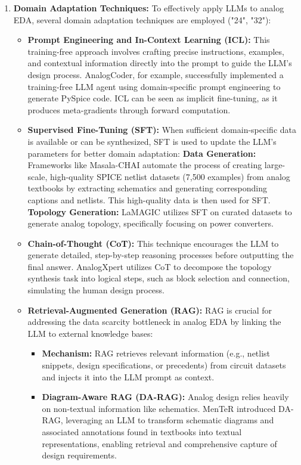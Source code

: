 \documentclass{ieeeaccess}
\begin{document}
\begin{enumerate}
	\item \textbf{Domain Adaptation Techniques:} To effectively apply LLMs to analog EDA, several domain adaptation techniques are employed ("24", "32"):
	    \begin{itemize} %
		    \item \textbf{Prompt Engineering and In-Context Learning (ICL):} This training-free approach involves crafting precise instructions, examples, and contextual information directly into the prompt to guide the LLM's design process. AnalogCoder, for example, successfully implemented a training-free LLM agent using domain-specific prompt engineering to generate PySpice code. ICL can be seen as implicit fine-tuning, as it produces meta-gradients through forward computation.
		    \item \textbf{Supervised Fine-Tuning (SFT):} When sufficient domain-specific data is available or can be synthesized, SFT is used to update the LLM's parameters for better domain adaptation:
		            \textbf{Data Generation:} Frameworks like Masala-CHAI automate the process of creating large-scale, high-quality SPICE netlist datasets (7,500 examples) from analog textbooks by extracting schematics and generating corresponding captions and netlists. This high-quality data is then used for SFT.
		            \textbf{Topology Generation:} LaMAGIC utilizes SFT on curated datasets to generate analog topology, specifically focusing on power converters.
		    \item \textbf{Chain-of-Thought (CoT):} This technique encourages the LLM to generate detailed, step-by-step reasoning processes before outputting the final answer. AnalogXpert utilizes CoT to decompose the topology synthesis task into logical steps, such as block selection and connection, simulating the human design process.
			\item \textbf{Retrieval-Augmented Generation (RAG):} RAG is crucial for addressing the data scarcity bottleneck in analog EDA by linking the LLM to external knowledge bases:
				\begin{itemize}
					\item \textbf{Mechanism:} RAG retrieves relevant information (e.g., netlist snippets, design specifications, or precedents) from circuit datasets and injects it into the LLM prompt as context.
					\item \textbf{Diagram-Aware RAG (DA-RAG):} Analog design relies heavily on non-textual information like schematics. MenTeR introduced DA-RAG, leveraging an LLM to transform schematic diagrams and associated annotations found in textbooks into textual representations, enabling retrieval and comprehensive capture of design requirements.

\end{itemize}
\end{itemize}
\end{enumerate}
\end{document}
